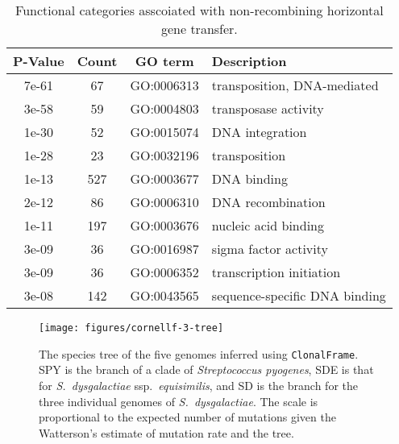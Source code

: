 \documentclass[10pt]{article}
\begin{document}
\begin{table}
\caption{\label{tab:go-events}Functional categories asscoiated with 
non-recombining horizontal gene transfer.}
\noindent \begin{centering}
\begin{tabular}{cccl}
\hline 
P-Value & Count & GO term & Description \\
\hline 
7e-61 &  67 & GO:0006313 & transposition, DNA-mediated\\
3e-58 &  59 & GO:0004803 & transposase activity\\
1e-30 &  52 & GO:0015074 & DNA integration\\
1e-28 &  23 & GO:0032196 & transposition\\
1e-13 & 527 & GO:0003677 & DNA binding\\
2e-12 &  86 & GO:0006310 & DNA recombination\\
1e-11 & 197 & GO:0003676 & nucleic acid binding\\
3e-09 &  36 & GO:0016987 & sigma factor activity\\
3e-09 &  36 & GO:0006352 & transcription initiation\\
3e-08 & 142 & GO:0043565 & sequence-specific DNA binding\\
\hline 
\end{tabular}
\par\end{centering}
\end{table}
\clearpage{}



\begin{figure}
\texttt{[image: figures/cornellf-3-tree]}
\caption{\label{fig:tree5}The species tree of the five genomes inferred using
\texttt{ClonalFrame}.  SPY is the branch of a clade of \textit{Streptococcus
pyogenes}, SDE is that for \textit{S.\ dysgalactiae} ssp.\textit{\ equisimilis},
and SD is the branch for the three individual genomes of \textit{S.\
dysgalactiae}. The scale is proportional to the expected number of mutations
given the Watterson's estimate of mutation rate and the tree.}
\end{figure}
\clearpage{}%
\end{document}
